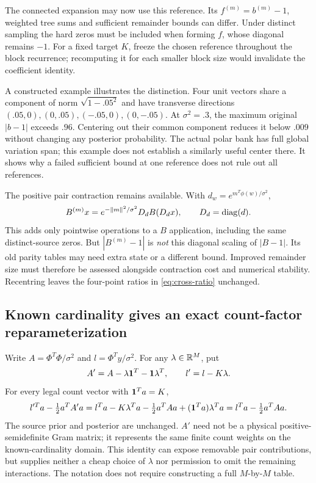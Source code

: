 \documentclass[10pt,a4paper]{article}
\begin{document}
The connected expansion may now use this reference. Its $f^{(m)}=b^{(m)}-1$, weighted tree sums and sufficient
remainder bounds can differ. Under distinct sampling the hard zeros must be included when forming $f$, whose
diagonal remains $-1$. For a fixed target $K$, freeze the chosen reference throughout the block recurrence;
recomputing it for each smaller block size would invalidate the coefficient identity.

A constructed example illustrates the distinction. Four unit vectors share a component of norm
$\sqrt{1-.05^2}$ and have transverse directions $(.05,0),(0,.05),(-.05,0),(0,-.05)$. At $\sigma^2=.3$,
the maximum original $|b-1|$ exceeds $.96$. Centering out their common component reduces it below $.009$
without changing any posterior probability. The actual polar bank has full global variation span; this example
does not establish a similarly useful center there. It shows why a failed sufficient bound at one reference
does not rule out all references.

The positive pair contraction remains available. With $d_w=e^{m^T\phi(w)/\sigma^2}$,
\begin{equation}
 B^{(m)}x=e^{-\|m\|^2/\sigma^2}D_dB(D_dx),\qquad D_d=\operatorname{diag}(d).
 \label{eq:centred-operator}
\end{equation}
This adds only pointwise operations to a $B$ application, including the same distinct-source zeros. But
$|B^{(m)}-1|$ is \emph{not} this diagonal scaling of $|B-1|$. Its old parity tables may need extra state or a
different bound. Improved remainder size must therefore be assessed alongside contraction cost and numerical
stability. Recentring leaves the four-point ratios in \eqref{eq:cross-ratio} unchanged.

\clearpage
\subsection{Known cardinality gives an exact count-factor reparameterization}
Write $A=\Phi^T\Phi/\sigma^2$ and $l=\Phi^Ty/\sigma^2$. For any $\lambda\in\mathbb{R}^M$, put
\[
 A'=A-\lambda\mathbf{1}^T-\mathbf{1}\lambda^T,\qquad l'=l-K\lambda.
\]
For every legal count vector with $\mathbf{1}^Ta=K$,
\[
 l'^Ta-\tfrac12a^TA'a
 =l^Ta-K\lambda^Ta-\tfrac12a^TAa+(\mathbf{1}^Ta)\lambda^Ta
 =l^Ta-\tfrac12a^TAa.
\]
The source prior and posterior are unchanged. $A'$ need not be a physical positive-semidefinite Gram matrix;
it represents the same finite count weights on the known-cardinality domain. This identity can expose
removable pair contributions, but supplies neither a cheap choice of $\lambda$ nor permission to omit the
remaining interactions. The notation does not require constructing a full $M$-by-$M$ table.
\end{document}

